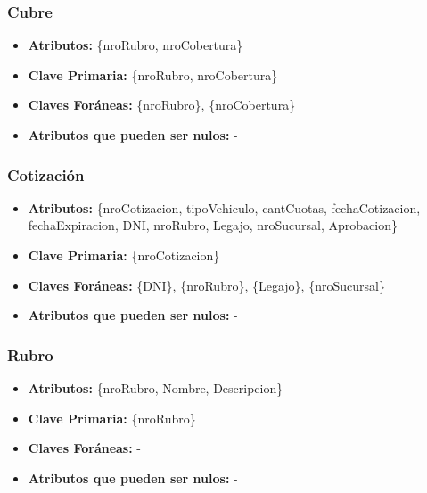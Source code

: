 \documentclass[a4paper,11pt]{article}
\begin{document}
\subsubsection{Cubre}

\begin{itemize}

	\item \textbf{Atributos:} \{nroRubro, nroCobertura\}

	\item \textbf{Clave Primaria:} \{nroRubro, nroCobertura\}
	
	\item \textbf{Claves Foráneas:} \{nroRubro\}, \{nroCobertura\}

	\item \textbf{Atributos que pueden ser nulos:} -
	
\end{itemize}


\subsubsection{Cotización}

\begin{itemize}

	\item \textbf{Atributos:} \{nroCotizacion, tipoVehiculo, cantCuotas, fechaCotizacion, fechaExpiracion, DNI, nroRubro, Legajo, nroSucursal, Aprobacion\}
	
	\item \textbf{Clave Primaria:} \{nroCotizacion\}
	
	\item \textbf{Claves Foráneas:} \{DNI\}, \{nroRubro\}, \{Legajo\}, \{nroSucursal\}

	\item \textbf{Atributos que pueden ser nulos:} -
	
\end{itemize}

\subsubsection{Rubro}

\begin{itemize}

	\item \textbf{Atributos:} \{nroRubro, Nombre, Descripcion\}
	
	\item \textbf{Clave Primaria:} \{nroRubro\}
	
	\item \textbf{Claves Foráneas:} -

	\item \textbf{Atributos que pueden ser nulos:} -
	
\end{itemize}
\end{document}
